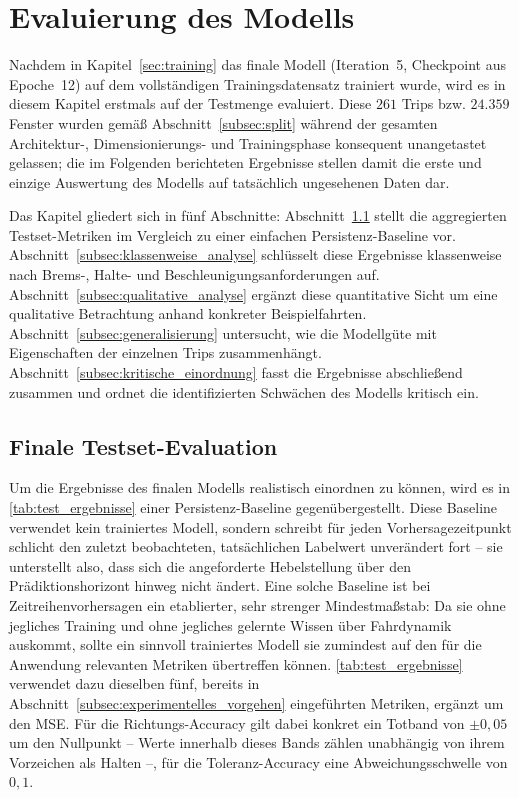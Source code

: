 \section{Evaluierung des Modells}
\label{sec:evaluation}

Nachdem in Kapitel~\ref{sec:training} das finale Modell (Iteration~5, Checkpoint aus Epoche~12) auf dem vollständigen Trainingsdatensatz trainiert wurde, wird es in diesem Kapitel erstmals auf der Testmenge evaluiert. Diese $261$ Trips bzw. $24.359$ Fenster wurden gemäß Abschnitt~\ref{subsec:split} während der gesamten Architektur-, Dimensionierungs- und Trainingsphase konsequent unangetastet gelassen; die im Folgenden berichteten Ergebnisse stellen damit die erste und einzige Auswertung des Modells auf tatsächlich ungesehenen Daten dar.

Das Kapitel gliedert sich in fünf Abschnitte: Abschnitt~\ref{subsec:finale_testevaluation} stellt die aggregierten Testset-Metriken im Vergleich zu einer einfachen Persistenz-Baseline vor. Abschnitt~\ref{subsec:klassenweise_analyse} schlüsselt diese Ergebnisse klassenweise nach Brems-, Halte- und Beschleunigungsanforderungen auf. Abschnitt~\ref{subsec:qualitative_analyse} ergänzt diese quantitative Sicht um eine qualitative Betrachtung anhand konkreter Beispielfahrten. Abschnitt~\ref{subsec:generalisierung} untersucht, wie die Modellgüte mit Eigenschaften der einzelnen Trips zusammenhängt. Abschnitt~\ref{subsec:kritische_einordnung} fasst die Ergebnisse abschließend zusammen und ordnet die identifizierten Schwächen des Modells kritisch ein.

\subsection{Finale Testset-Evaluation}
\label{subsec:finale_testevaluation}

Um die Ergebnisse des finalen Modells realistisch einordnen zu können, wird es in \autoref{tab:test_ergebnisse} einer Persistenz-Baseline gegenübergestellt. Diese Baseline verwendet kein trainiertes Modell, sondern schreibt für jeden Vorhersagezeitpunkt schlicht den zuletzt beobachteten, tatsächlichen Labelwert unverändert fort -- sie unterstellt also, dass sich die angeforderte Hebelstellung über den Prädiktionshorizont hinweg nicht ändert. Eine solche Baseline ist bei Zeitreihenvorhersagen ein etablierter, sehr strenger Mindestmaßstab: Da sie ohne jegliches Training und ohne jegliches gelernte Wissen über Fahrdynamik auskommt, sollte ein sinnvoll trainiertes Modell sie zumindest auf den für die Anwendung relevanten Metriken übertreffen können. \autoref{tab:test_ergebnisse} verwendet dazu dieselben fünf, bereits in Abschnitt~\ref{subsec:experimentelles_vorgehen} eingeführten Metriken, ergänzt um den \gls{MSE}. Für die Richtungs-Accuracy gilt dabei konkret ein Totband von $\pm0{,}05$ um den Nullpunkt -- Werte innerhalb dieses Bands zählen unabhängig von ihrem Vorzeichen als \glqq Halten\grqq{} --, für die Toleranz-Accuracy eine Abweichungsschwelle von $0{,}1$.

